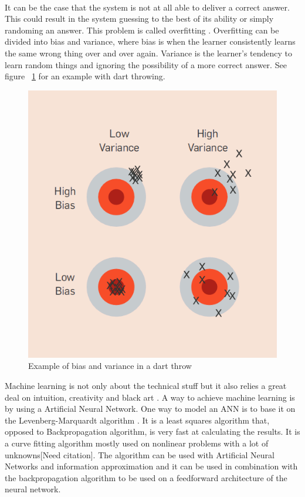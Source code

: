 \documentclass[twoside,11pt,openright]{report}
\begin{document}
\\[0.5cm]
It can be the case that the system is not at all able to deliver a correct answer. This could result in the system guessing to the best of its ability or simply randoming an answer. This problem is called overfitting \cite{18}. Overfitting can be divided into bias and variance, where bias is when the learner consistently learns the same wrong thing over and over again. Variance is the learner's tendency to learn random things and ignoring the possibility of a more correct answer. See figure ~\ref{fig:biasandvariance} for an example with dart throwing.
\begin{figure}[h!]
\centering
\includegraphics[width=0.5\linewidth,natwidth=898,natheight=587]{billeder/biasVSvariance.png}
\caption{Example of bias and variance in a dart throw \cite{18}}
\label{fig:biasandvariance}
\end{figure}

Machine learning is not only about the technical stuff but it also relies a great deal on intuition, creativity and  black art \cite{18}. 
\newline A way to achieve machine learning is by using a Artificial Neural Network. One way to model an ANN is to base it on the
Levenberg-Marquardt algorithm \cite{7,9,10}. It is a least squares algorithm that,
opposed to Backpropagation algorithm\cite{8}, is very fast at calculating the
results. It is a curve fitting algorithm mostly used on nonlinear problems with
a lot of unknowns[Need citation]. The algorithm can be used with Artificial Neural Networks and information approximation\cite{8} and it can be used in combination with the backpropagation algorithm to be used on a feedforward architecture of the neural network\cite{13}.

\end{document}

